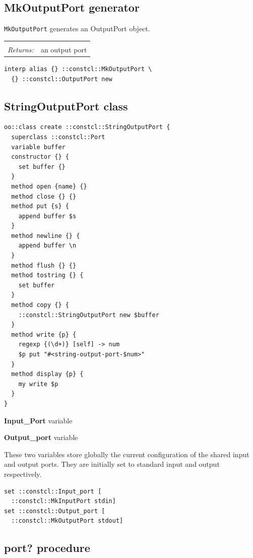 \documentclass[twoside,9pt]{report}
\begin{document}
\subsection{MkOutputPort generator}
\label{mkoutputport-generator}


\texttt{MkOutputPort} generates an OutputPort object.

\noindent\begin{tabular}{ |p{1.9cm} p{8cm}| }
\hline
\rowcolor[HTML]{CCCCCC} \multicolumn{2}{|l|}{\bf MkOutputPort (internal)} \\
\textit{Returns:} & an output port \\
\hline
\end{tabular}
\begin{lstlisting}
interp alias {} ::constcl::MkOutputPort \
  {} ::constcl::OutputPort new
\end{lstlisting}
\subsection{StringOutputPort class}
\label{stringoutputport-class}
\begin{lstlisting}
oo::class create ::constcl::StringOutputPort {
  superclass ::constcl::Port
  variable buffer
  constructor {} {
    set buffer {}
  }
  method open {name} {}
  method close {} {}
  method put {s} {
    append buffer $s
  }
  method newline {} {
    append buffer \n
  }
  method flush {} {}
  method tostring {} {
    set buffer
  }
  method copy {} {
    ::constcl::StringOutputPort new $buffer
  }
  method write {p} {
    regexp {(\d+)} [self] -> num
    $p put "#<string-output-port-$num>"
  }
  method display {p} {
    my write $p
  }
}
\end{lstlisting}


\textbf{Input\_Port} variable


\textbf{Output\_port} variable


These two variables store globally the current configuration of the shared input and output ports. They are initially set to standard input and output respectively.

\begin{lstlisting}
set ::constcl::Input_port [
  ::constcl::MkInputPort stdin]
set ::constcl::Output_port [
  ::constcl::MkOutputPort stdout]
\end{lstlisting}
\subsection{port? procedure}
\label{port?-procedure}
\end{document}
